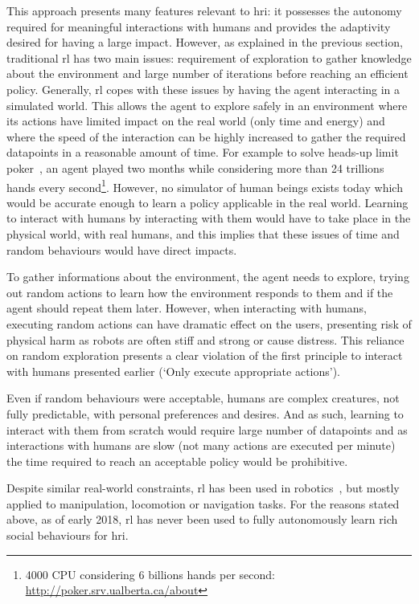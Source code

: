 	This approach presents many features relevant to \gls{hri}: it possesses the autonomy required for meaningful interactions with humans and provides the adaptivity desired for having a large impact. However, as explained in the previous section, traditional \gls{rl} has two main issues: requirement of exploration to gather knowledge about the environment and large number of iterations before reaching an efficient policy. Generally, \gls{rl} copes with these issues by having the agent interacting in a simulated world. This allows the agent to explore safely in an environment where its actions have limited impact on the real world (only time and energy) and where the speed of the interaction can be highly increased to gather the required datapoints in a reasonable amount of time. For example to solve heads-up limit poker~\citep{bowling2015heads}, an agent played two months while considering more than 24 trillions hands every second\footnote{4000 CPU considering 6 billions hands per second: \url{http://poker.srv.ualberta.ca/about}}. However, no simulator of human beings exists today which would be accurate enough to learn a policy applicable in the real world. Learning to interact with humans by interacting with them would have to take place in the physical world, with real humans, and this implies that these issues of time and random behaviours would have direct impacts. 
	
	To gather informations about the environment, the agent needs to explore, trying out random actions to learn how the environment responds to them and if the agent should repeat them later. However, when interacting with humans, executing random actions can have dramatic effect on the users, presenting risk of physical harm as robots are often stiff and strong or cause distress. This reliance on random exploration presents a clear violation of the first principle to interact with humans presented earlier (`Only execute appropriate actions').
	
	Even if random behaviours were acceptable, humans are complex creatures, not fully predictable, with personal preferences and desires. And as such, learning to interact with them from scratch would require large number of datapoints and as interactions with humans are slow (not many actions are executed per minute) the time required to reach an acceptable policy would be prohibitive. 
	
	Despite similar real-world constraints, \gls{rl} has been used in robotics~\citep{kober2013reinforcement}, but mostly applied to manipulation, locomotion or navigation tasks. For the reasons stated above, as of early 2018, \gls{rl} has never been used to fully autonomously learn rich social behaviours for \gls{hri}. 
	

